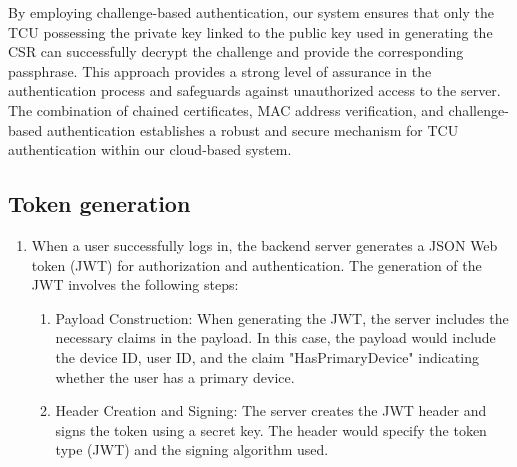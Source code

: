 \documentclass[
12pt,
oneside, 
onehalfspacing, 
nolistspacing, 
parskip, 
chapterinoneline, 
]{AASTCOMPUTER}
\begin{document}
By employing challenge-based authentication, our system ensures that only the TCU possessing the private key linked to the public key used in generating the CSR can successfully decrypt the challenge and provide the corresponding passphrase. This approach provides a strong level of assurance in the authentication process and safeguards against unauthorized access to the server. The combination of chained certificates, MAC address verification, and challenge-based authentication establishes a robust and secure mechanism for TCU authentication within our cloud-based system.

\subsection{Token generation}
\begin{enumerate}
\item When a user successfully logs in, the backend server generates a JSON Web token (JWT) for authorization and authentication. The generation of the JWT involves the following steps:
\begin{enumerate}
\item Payload Construction: When generating the JWT, the server includes the necessary claims in the payload. In this case, the payload would include the device ID, user ID, and the claim "HasPrimaryDevice" indicating whether the user has a primary device.
\item Header Creation and Signing: The server creates the JWT header and signs the token using a secret key. The header would specify the token type (JWT) and the signing algorithm used.
\end{enumerate}
\end{enumerate}
\end{document}

